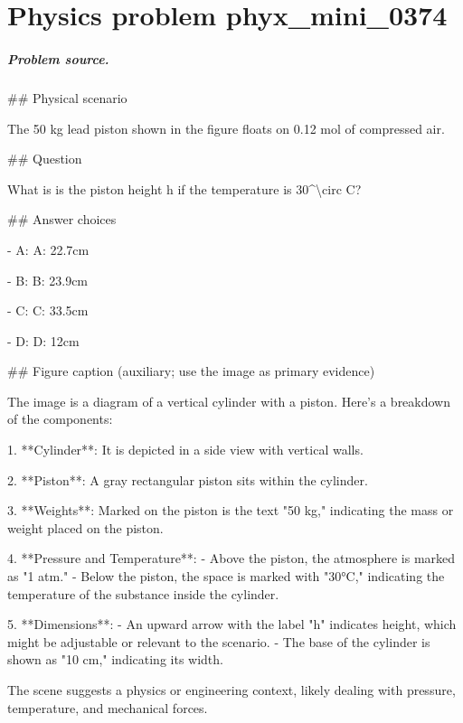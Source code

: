
\chapter{Physics problem phyx\_mini\_0374}
\label{ch:PhyXMiniProblems_problem_phyx_mini_0374}

\paragraph{Problem source.}
\#\# Physical scenario

The 50 kg lead piston shown in the figure floats on 0.12 mol of compressed air.

\#\# Question

What is is the piston height h if the temperature is 30\textasciicircum{}\textbackslash{}circ C?

\#\# Answer choices

- A: A: 22.7cm

- B: B: 23.9cm

- C: C: 33.5cm

- D: D: 12cm

\#\# Figure caption (auxiliary; use the image as primary evidence)

The image is a diagram of a vertical cylinder with a piston. Here's a breakdown of the components:

1. **Cylinder**: It is depicted in a side view with vertical walls.

2. **Piston**: A gray rectangular piston sits within the cylinder.

3. **Weights**: Marked on the piston is the text "50 kg," indicating the mass or weight placed on the piston.

4. **Pressure and Temperature**: 
   - Above the piston, the atmosphere is marked as "1 atm."
   - Below the piston, the space is marked with "30°C," indicating the temperature of the substance inside the cylinder. 

5. **Dimensions**:
   - An upward arrow with the label "h" indicates height, which might be adjustable or relevant to the scenario.
   - The base of the cylinder is shown as "10 cm," indicating its width.

The scene suggests a physics or engineering context, likely dealing with pressure, temperature, and mechanical forces.


